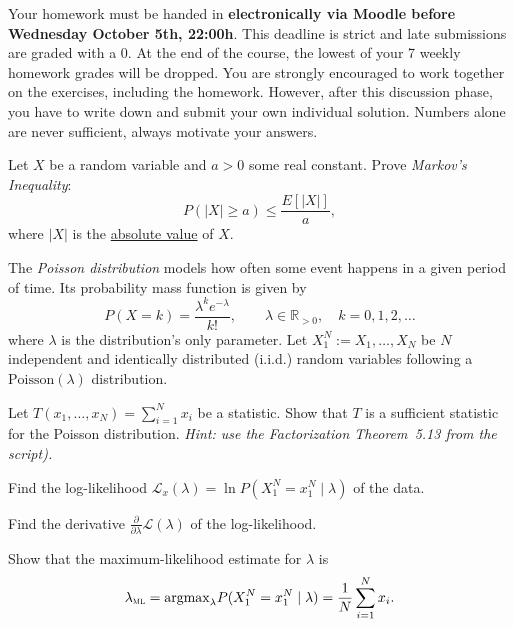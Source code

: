 \documentclass[a4paper,10pt,landscape,twocolumn]{scrartcl}
\newcommand\deadline{Wednesday October 5th, 22:00h}
\begin{document}
\homeworkproblems

{\sffamily\noindent
Your homework must be handed in \textbf{electronically via Moodle before \deadline}.  This deadline is strict and late submissions are graded with a 0. At the end of the course, the lowest of your 7 weekly homework grades will be dropped. You are strongly encouraged to work together on the exercises, including the homework. However, after this discussion phase, you have to write down and submit your own individual solution. Numbers alone are never sufficient, always motivate your answers.
}

\begin{exercise}
	Let $X$ be a random variable and $a > 0$ some real constant. Prove 
	\emph{Markov's Inequality}:
	\[
	P(|X| \ge a) \le \frac{E[|X|]}{a},
	\]
	where $|X|$ is the \href{https://en.wikipedia.org/wiki/Absolute_value}{absolute value} of $X$.
\end{exercise}


\begin{exercise}
	The \emph{Poisson distribution} models how often some event happens in a given period of time. Its probability mass function is given by
	\[
	P(X = k) = {\frac {\lambda ^{k}e^{-\lambda }}{k!}}, \qquad \lambda \in \mathbb{R}_{>0}, \quad k=0,1,2,\dots
	\]
	where $\lambda$ is the distribution's only parameter. 
	Let $X_1^N := X_1, \dots, X_N$ be $N$ independent and identically distributed (i.i.d.) random variables following a $\text{Poisson}(\lambda)$ distribution.
		
	\begin{subex}[1pt]
	Let $T(x_1, \dots, x_N) = \sum_{i=1}^N x_i$ be a
        statistic. Show that $T$ is a sufficient statistic for the
        Poisson distribution. \emph{Hint: use the Factorization
          Theorem~5.13 from the script).}
	\end{subex}

	\begin{subex}[0.5pt]
	Find the log-likelihood $\mathcal L_x(\lambda) = \ln P(X_1^N =
        x_1^N\mid \lambda)$ of the data.
	\end{subex}
	
	\begin{subex}[0.5pt]
		Find the derivative $\frac{\partial}{\partial \lambda} \mathcal L(\lambda)$ of the log-likelihood.
	\end{subex}
	
	\begin{subex}[1pt]
		Show that the maximum-likelihood estimate for $\lambda$ is
		\[
			\lambda_\textsc{ml} = \text{argmax}_\lambda
                        P(X_1^N = x_1^N \mid \lambda) = \frac{1}{N}\sum_{i=1}^N x_i.
		\]
	\end{subex}
	
\end{exercise}
\end{document}
